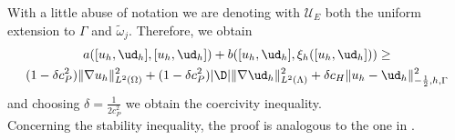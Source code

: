 With a little abuse of notation we are denoting with $\mathcal{U}_E$ both the uniform extension to $\Gamma$ and $\tilde{\omega}_j$. Therefore, we obtain
\begin{multline*}
a([u_h, {\ud}_h],[u_h, {\ud}_h] ) + b([u_h, {\ud}_h], \xi_h([u_h, {\ud}_h]))
\geq \\
(1-\delta c_P^2) \|\nabla u_h\|^2_{L^2(\Omega)} + (1- \delta c_P^2) |\D|\|\nabla {\ud}_h\|^2_{L^2(\Lambda)}
+\delta c_H \|u_h-{\ud}_h\|^2_{-\frac 12,h,\Gamma}
\end{multline*}
and choosing $\delta=\frac{1}{2c_P^2}$ we obtain the coercivity inequality.\\
Concerning the stability inequality, the proof is analogous to the one in \cite{burman2014}.